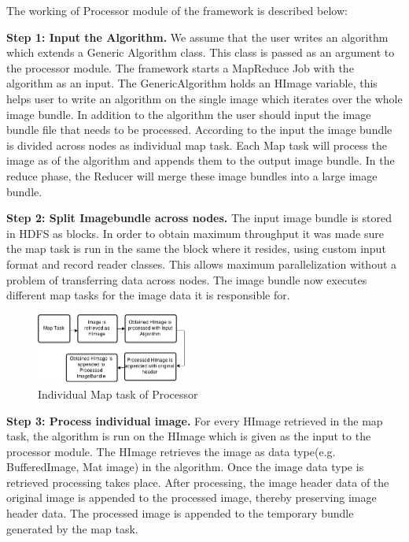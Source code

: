 \documentclass[conference]{IEEEtran}
\begin{document}
The working of Processor module of the framework is described below:

\textbf{Step 1: Input the Algorithm.} We assume that the user writes an algorithm which extends a Generic Algorithm class. This class is passed as an argument to the processor module. The framework starts a MapReduce Job with the algorithm as an input. The GenericAlgorithm holds an HImage variable, this helps user to write an algorithm on the single image which iterates over the whole image bundle. In addition to the algorithm the user should input the image bundle file that needs to be processed. According to the input the image bundle is divided across nodes as individual map task. Each Map task will process the image as of the algorithm and appends them to the output image bundle. In the reduce phase, the Reducer will merge these image bundles into a large image bundle.

\textbf{Step 2: Split Imagebundle across nodes.} The input image bundle is stored in HDFS as blocks. In order to obtain maximum throughput it was made sure the map task is run in the same the block where it resides, using custom input format and record reader classes. This allows maximum parallelization without a problem of transferring data across nodes. The image bundle now executes different map tasks for the image data it is responsible for.

\begin{figure}[h]
	\centering
	\includegraphics[width=0.45\textwidth]{pro-map}
	\caption{Individual Map task of Processor}
	\label{fig:pro-map}
\end{figure}

\textbf{Step 3: Process individual image.} For every HImage retrieved in the map task, the algorithm is run on the HImage which is given as the input to the processor module. The HImage retrieves the image as data type(e.g. BufferedImage, Mat image) in the algorithm. Once the image data type is retrieved processing takes place. After processing, the image header data of the original image is appended to the processed image, thereby preserving image header data. The processed image is appended to the temporary bundle generated by the map task.
\end{document}
